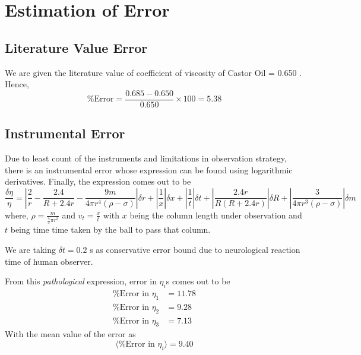 \documentclass[11pt, a4paper, abstract=true]{scrartcl}
\begin{document}
\section{Estimation of Error}
\subsection{Literature Value Error}
We are given the literature value of coefficient of viscosity of Castor Oil = 0.650 . Hence, \[\%\text{Error} = \frac{0.685 - 0.650}{0.650} \times 100 = \boxed{5.38}\]
\subsection{Instrumental Error}
Due to least count of the instruments and limitations in observation strategy, there is an instrumental error whose expression can be found using logarithmic derivatives. Finally, the expression comes out to be
\begin{equation*}
    \frac{\delta\eta}{\eta} = \left|\frac{2}{r} - \frac{2.4}{R+2.4r} - \frac{9m}{4\pi r^4(\rho - \sigma)}\right|\delta r + \left|\frac{1}{x}\right|\delta x + \left|\frac{1}{t}\right|\delta t + \left|\frac{2.4r}{R(R+2.4r)}\right|\delta R + \left|\frac{3}{4\pi r^3(\rho - \sigma)}\right|\delta m
\end{equation*}
where, \(\rho = \frac{m}{\frac{4}{3}\pi r^3}\) and \(v_t = \frac{x}{t}\) with \(x\) being the column length under observation and \(t\) being time time taken by the ball to pass that column.
\begin{remark}
    We are taking \(\delta t = 0.2\) s as conservative error bound due to neurological reaction time of human observer.
\end{remark}
From this \emph{pathological} expression, error in \(\eta_i\)s comes out to be 
\begin{align*}
    \%\text{Error in } \eta_1 &= 11.78 \\ \%\text{Error in } \eta_2 &= 9.28 \\ \%\text{Error in } \eta_3 &= 7.13
\end{align*}
With the mean value of the error as \[\langle\%\text{Error in } \eta_i\rangle = \boxed{9.40}\]
\end{document}
